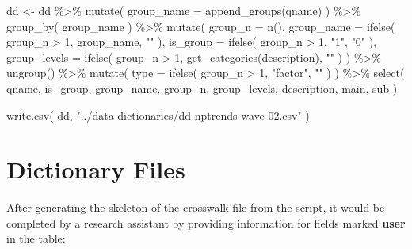 \documentclass[
  letterpaper,
]{scrbook}
\newenvironment{Shaded}{\begin{snugshade}}{\end{snugshade}}
\newcommand{\AttributeTok}[1]{\textcolor[rgb]{0.40,0.45,0.13}{#1}}
\newcommand{\DecValTok}[1]{\textcolor[rgb]{0.68,0.00,0.00}{#1}}
\newcommand{\FunctionTok}[1]{\textcolor[rgb]{0.28,0.35,0.67}{#1}}
\newcommand{\NormalTok}[1]{\textcolor[rgb]{0.00,0.23,0.31}{#1}}
\newcommand{\OtherTok}[1]{\textcolor[rgb]{0.00,0.23,0.31}{#1}}
\newcommand{\SpecialCharTok}[1]{\textcolor[rgb]{0.37,0.37,0.37}{#1}}
\newcommand{\StringTok}[1]{\textcolor[rgb]{0.13,0.47,0.30}{#1}}
\begin{document}
\begin{Shaded}
\begin{Highlighting}[]
\NormalTok{dd }\OtherTok{\textless{}{-}} 
\NormalTok{  dd }\SpecialCharTok{\%\textgreater{}\%} 
  \FunctionTok{mutate}\NormalTok{( }\AttributeTok{group\_name =} \FunctionTok{append\_groups}\NormalTok{(qname) ) }\SpecialCharTok{\%\textgreater{}\%}
  \FunctionTok{group\_by}\NormalTok{( group\_name ) }\SpecialCharTok{\%\textgreater{}\%} 
  \FunctionTok{mutate}\NormalTok{( }\AttributeTok{group\_n =} \FunctionTok{n}\NormalTok{(),}
          \AttributeTok{group\_name =} \FunctionTok{ifelse}\NormalTok{( group\_n }\SpecialCharTok{\textgreater{}} \DecValTok{1}\NormalTok{, group\_name, }\StringTok{""}\NormalTok{ ),}
          \AttributeTok{is\_group =} \FunctionTok{ifelse}\NormalTok{( group\_n }\SpecialCharTok{\textgreater{}} \DecValTok{1}\NormalTok{, }\StringTok{"1"}\NormalTok{, }\StringTok{"0"}\NormalTok{ ),}
          \AttributeTok{group\_levels =} \FunctionTok{ifelse}\NormalTok{( group\_n }\SpecialCharTok{\textgreater{}} \DecValTok{1}\NormalTok{, }\FunctionTok{get\_categories}\NormalTok{(description), }\StringTok{""}\NormalTok{ ) ) }\SpecialCharTok{\%\textgreater{}\%}
  \FunctionTok{ungroup}\NormalTok{() }\SpecialCharTok{\%\textgreater{}\%} 
  \FunctionTok{mutate}\NormalTok{( }\AttributeTok{type =} \FunctionTok{ifelse}\NormalTok{( group\_n }\SpecialCharTok{\textgreater{}} \DecValTok{1}\NormalTok{, }\StringTok{"factor"}\NormalTok{, }\StringTok{""}\NormalTok{ ) ) }\SpecialCharTok{\%\textgreater{}\%} 
  \FunctionTok{select}\NormalTok{( qname, is\_group, group\_name, group\_n, group\_levels, }
\NormalTok{          description, main, sub )}


\FunctionTok{write.csv}\NormalTok{( dd, }\StringTok{"../data{-}dictionaries/dd{-}nptrends{-}wave{-}02.csv"}\NormalTok{ )}
\end{Highlighting}
\end{Shaded}

\section{Dictionary Files}\label{dictionary-files}

After generating the skeleton of the crosswalk file from the script, it
would be completed by a research assistant by providing information for
fields marked \textbf{user} in the table:
\end{document}
